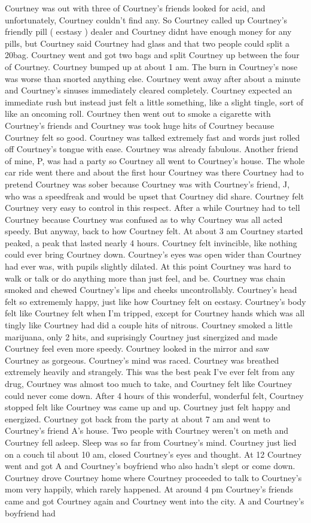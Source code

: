 \documentclass[12pt]{book}
\begin{document}
Courtney was out with three of Courtney's friends looked for acid, and unfortunately, Courtney couldn't find any. So Courtney called up Courtney's friendly pill ( ecstasy ) dealer and Courtney didnt have enough money for any pills, but Courtney said Courtney had glass and that two people could split a 20bag. Courtney went and got two bags and split Courtney up between the four of Courtney. Courtney bumped up at about 1 am. The burn in Courtney's nose was worse than snorted anything else. Courtney went away after about a minute and Courtney's sinuses immediately cleared completely. Courtney expected an immediate rush but instead just felt a little something, like a slight tingle, sort of like an oncoming roll. Courtney then went out to smoke a cigarette with Courtney's friends and Courtney was took huge hits of Courtney because Courtney felt so good. Courtney was talked extremely fast and words just rolled off Courtney's tongue with ease. Courtney was already fabulous. Another friend of mine, P, was had a party so Courtney all went to Courtney's house. The whole car ride went there and about the first hour Courtney was there Courtney had to pretend Courtney was sober because Courtney was with Courtney's friend, J, who was a speedfreak and would be upset that Courtney did share. Courtney felt Courtney very easy to control in this respect. After a while Courtney had to tell Courtney because Courtney was confused as to why Courtney was all acted speedy. But anyway, back to how Courtney felt. At about 3 am Courtney started peaked, a peak that lasted nearly 4 hours. Courtney felt invincible, like nothing could ever bring Courtney down. Courtney's eyes was open wider than Courtney had ever was, with pupils slightly dilated. At this point Courtney was hard to walk or talk or do anything more than just feel, and be. Courtney was chain smoked and chewed Courtney's lips and cheeks uncontrollably. Courtney's head felt so extrememly happy, just like how Courtney felt on ecstasy. Courtney's body felt like Courtney felt when I'm tripped, except for Courtney hands which was all tingly like Courtney had did a couple hits of nitrous. Courtney smoked a little marijuana, only 2 hits, and suprisingly Courtney just sinergized and made Courtney feel even more speedy. Courtney looked in the mirror and saw Courtney as gorgeous. Courtney's mind was raced. Courtney was breathed extremely heavily and strangely. This was the best peak I've ever felt from any drug, Courtney was almost too much to take, and Courtney felt like Courtney could never come down. After 4 hours of this wonderful, wonderful felt, Courtney stopped felt like Courtney was came up and up. Courtney just felt happy and energized. Courtney got back from the party at about 7 am and went to Courtney's friend A's house. Two people with Courtney weren't on meth and Courtney fell asleep. Sleep was so far from Courtney's mind. Courtney just lied on a couch til about 10 am, closed Courtney's eyes and thought. At 12 Courtney went and got A and Courtney's boyfriend who also hadn't slept or come down. Courtney drove Courtney home where Courtney proceeded to talk to Courtney's mom very happily, which rarely happened. At around 4 pm Courtney's friends came and got Courtney again and Courtney went into the city. A and Courtney's boyfriend had 
\end{document}
